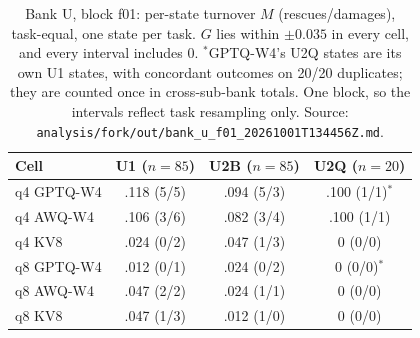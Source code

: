 \begin{table}[t]
\centering\scriptsize\setlength{\tabcolsep}{3.5pt}
\begin{tabular}{@{}lccc@{}}
\toprule
Cell & U1 ($n{=}85$) & U2B ($n{=}85$) & U2Q ($n{=}20$) \\
\midrule
q4 GPTQ-W4 & .118 (5/5) & .094 (5/3) & .100 (1/1)$^\ast$ \\
q4 AWQ-W4  & .106 (3/6) & .082 (3/4) & .100 (1/1) \\
q4 KV8     & .024 (0/2) & .047 (1/3) & 0 (0/0) \\
q8 GPTQ-W4 & .012 (0/1) & .024 (0/2) & 0 (0/0)$^\ast$ \\
q8 AWQ-W4  & .047 (2/2) & .024 (1/1) & 0 (0/0) \\
q8 KV8     & .047 (1/3) & .012 (1/0) & 0 (0/0) \\
\bottomrule
\end{tabular}
\caption{Bank U, block f01: per-state turnover $M$ (rescues/damages), task-equal, one state per task. $G$ lies within $\pm0.035$ in every cell, and every interval includes 0. $^\ast$GPTQ-W4's U2Q states are its own U1 states, with concordant outcomes on 20/20 duplicates; they are counted once in cross-sub-bank totals. One block, so the intervals reflect task resampling only. Source: \nolinkurl{analysis/fork/out/bank_u_f01_20261001T134456Z.md}.}
\label{tab:banku}
\end{table}

